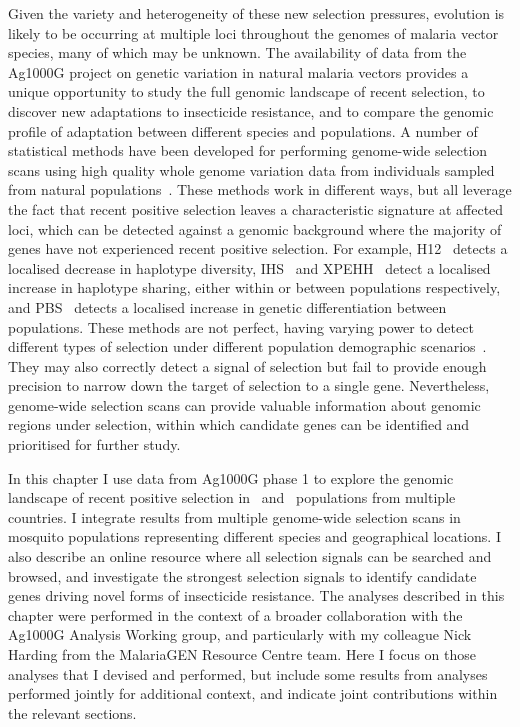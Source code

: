 \begin{refsection}
Given the variety and heterogeneity of these new selection pressures, evolution is likely to be occurring at multiple loci throughout the genomes of malaria vector species, many of which may be unknown.
%
The availability of data from the Ag1000G project on genetic variation in natural malaria vectors provides a unique opportunity to study the full genomic landscape of recent selection, to discover new adaptations to insecticide resistance, and to compare the genomic profile of adaptation between different species and populations.
%
A number of statistical methods have been developed for performing genome-wide selection scans using high quality whole genome variation data from individuals sampled from natural populations~\parencite{Oleksyk2010,Haasl2016,Vatsiou2016,Pavlidis2017,Booker2017}.
%
These methods work in different ways, but all leverage the fact that recent positive selection leaves a characteristic signature at affected loci, which can be detected against a genomic background where the majority of genes have not experienced recent positive selection.
%
For example, H12~\parencite{Garud2015} detects a localised decrease in haplotype diversity, IHS~\parencite{Voight2006} and XPEHH~\parencite{Sabeti2007} detect a localised increase in haplotype sharing, either within or between populations respectively, and PBS~\parencite{Yi2010,Crawford2017} detects a localised increase in genetic differentiation between populations.
%
These methods are not perfect, having varying power to detect different types of selection under different population demographic scenarios~\parencite{Haasl2016,Vatsiou2016,Pavlidis2017,Booker2017}.
%
They may also correctly detect a signal of selection but fail to provide enough precision to narrow down the target of selection to a single gene.
%
Nevertheless, genome-wide selection scans can provide valuable information about genomic regions under selection, within which candidate genes can be identified and prioritised for further study.


In this chapter I use data from Ag1000G phase 1 to explore the genomic landscape of recent positive selection in \agam\ and \acol\ populations from multiple countries.
%
I integrate results from multiple genome-wide selection scans in mosquito populations representing different species and geographical locations.
%
I also describe an online resource where all selection signals can be searched and browsed, and investigate the strongest selection signals to identify candidate genes driving novel forms of insecticide resistance.
%
The analyses described in this chapter were performed in the context of a broader collaboration with the Ag1000G Analysis Working group, and particularly with my colleague Nick Harding from the MalariaGEN Resource Centre team.
%
Here I focus on those analyses that I devised and performed, but include some results from analyses performed jointly for additional context, and indicate joint contributions within the relevant sections.
%



\end{refsection}
